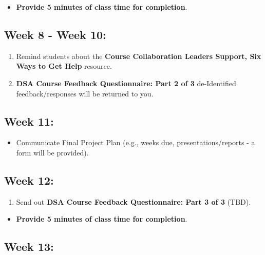 \documentclass[
]{book}
\providecommand{\tightlist}{%
  \setlength{\itemsep}{0pt}\setlength{\parskip}{0pt}}
\begin{document}
\begin{itemize}
\tightlist
\item
  \textbf{Provide 5 minutes of class time for completion}.
\end{itemize}

\subsection{Week 8 - Week 10:}\label{week-8---week-10}

\begin{enumerate}
\def\labelenumi{\arabic{enumi})}
\item
  Remind students about the \textbf{Course Collaboration Leaders Support, Six Ways to Get Help} resource.
\item
  \textbf{DSA Course Feedback Questionnaire: Part 2 of 3} de-Identified feedback/responses will be returned to you.
\end{enumerate}

\subsection{Week 11:}\label{week-11}

\begin{itemize}
\tightlist
\item
  Communicate Final Project Plan (e.g., weeks due, presentations/reports - a form will be provided).
\end{itemize}

\subsection{Week 12:}\label{week-12}

\begin{enumerate}
\def\labelenumi{\arabic{enumi})}
\tightlist
\item
  Send out { \textbf{DSA Course Feedback Questionnaire: Part 3 of 3} } (TBD).
\end{enumerate}

\begin{itemize}
\tightlist
\item
  \textbf{Provide 5 minutes of class time for completion}.
\end{itemize}

\subsection{Week 13:}\label{week-13}
\end{document}
